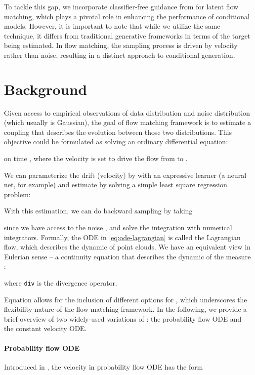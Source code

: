 \documentclass{article}
\theoremstyle{plain}
\theoremstyle{definition}
\theoremstyle{remark}
\begin{document}
To tackle this gap, we incorporate classifier-free guidance from \cite{ho2022classifier} for latent flow matching, which plays a pivotal role in enhancing the performance of conditional models. However, it is important to note that while we utilize the same technique, it differs from traditional generative frameworks in terms of the target being estimated. In flow matching, the sampling process is driven by velocity rather than noise, resulting in a distinct approach to conditional generation.

\section{Background}

Given access to empirical observations of data distribution 
and noise distribution  (which usually is Gaussian), the goal
of flow matching framework is to estimate a coupling  that
describes the evolution between those two distributions.
This objective could be formulated as solving an ordinary differential equation:

on time , where the velocity 
is set to drive the flow from  to .

We can parameterize the drift (velocity) by  with an expressive learner (a neural net, for example) and estimate  by solving a simple least square regression problem:

With this estimation, we can do backward sampling by taking

since we have access to the noise , and solve the integration with numerical integrators.
Formally, the ODE in \eqref{eq:ode-lagrangian} is called the Lagrangian flow, which describes the dynamic of point clouds.
We have an equivalent view in Eulerian sense -- a continuity equation that describes the dynamic of the measure  \cite{ambrosio2005gradient}:

where \texttt{div} is the divergence operator.

Equation  allows for the inclusion of different options for , which underscores the flexibility nature of the flow matching framework.
In the following, we provide a brief overview of two widely-used variations of : the probability flow ODE and the constant velocity ODE.

\paragraph{Probability flow ODE}
Introduced in \cite{song2020score}, the velocity in probability flow ODE has the form
\end{document}
